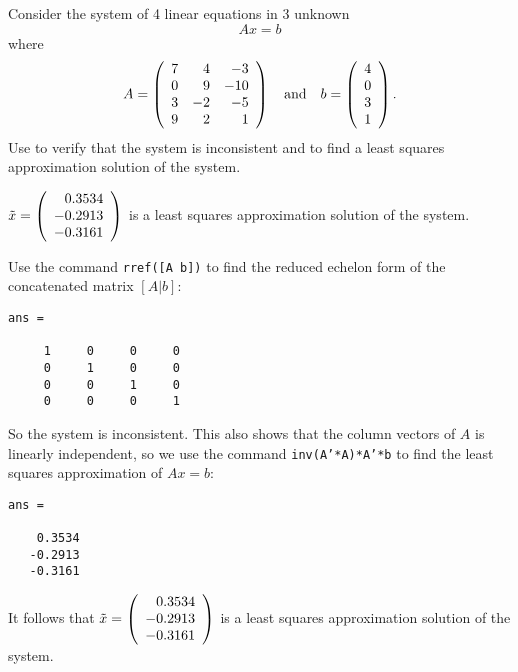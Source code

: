 \documentclass{ximera}
\begin{document}
\begin{computerExercise}\label{YZ_9.1.15}
Consider the system of 4 linear equations in 3 unknown
\[
Ax=b
\]
where 
\[
A=\left(\begin{array}{rrrrrrrrrrrrrrrrrr} 7&4&-3\\0&9&-10\\3&-2&-5\\9&2&1 \end{array}\right) \quad\mbox{and}\quad b=\left(\begin{array}{rrrrrrrrrrrrrrrrrr} 4\\0\\3\\1 \end{array}\right).
\] 
Use \Matlab to verify that the system is inconsistent and to find a least squares approximation solution of the system.
\begin{solution}

\ans  $\tilde{x}=\left(\begin{array}{rrrrrrrrrrrrrrrrrr} 0.3534\\-0.2913\\-0.3161 \end{array}\right)$ is a least squares approximation solution of the system.

\soln Use the command {\tt rref([A b])} to find the reduced echelon form of the concatenated matrix $[A|b]$:
\begin{verbatim}
ans =

     1     0     0     0
     0     1     0     0
     0     0     1     0
     0     0     0     1
\end{verbatim}
So the system is inconsistent. This also shows that the column vectors of $A$ is linearly independent, so we use the command {\tt inv(A'*A)*A'*b} to find the least squares approximation of $Ax = b$:

\begin{verbatim}
ans =

    0.3534
   -0.2913
   -0.3161
\end{verbatim}
It follows that $\tilde{x} = \left(\begin{array}{rrrrrrrrrrrrrrrrrr} 0.3534\\-0.2913\\-0.3161 \end{array}\right)$ is a least squares approximation solution of the system.
\end{solution}
\end{computerExercise}
\end{document}

